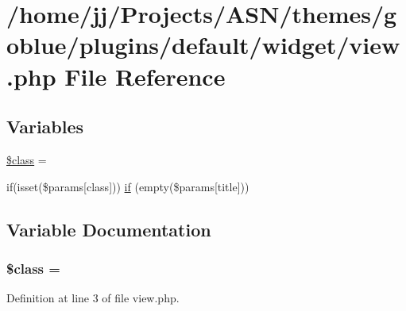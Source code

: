 \hypertarget{themes_2goblue_2plugins_2default_2widget_2view_8php}{}\section{/home/jj/\+Projects/\+A\+S\+N/themes/goblue/plugins/default/widget/view.php File Reference}
\label{themes_2goblue_2plugins_2default_2widget_2view_8php}
\subsection*{Variables}
\begin{DoxyCompactItemize}
\item 
\hyperlink{themes_2goblue_2plugins_2default_2widget_2view_8php_a252ba022809910ea710a068fc1bab657}{\$class} = \textquotesingle{}\textquotesingle{}
\item 
if(isset(\$params\mbox{[}\textquotesingle{}class\textquotesingle{}\mbox{]})) \hyperlink{themes_2goblue_2plugins_2default_2widget_2view_8php_a29158bf47ab232dfbfaf5bc7a931d4ae}{if} (empty(\$params\mbox{[}\textquotesingle{}title\textquotesingle{}\mbox{]}))
\end{DoxyCompactItemize}


\subsection{Variable Documentation}
\subsubsection[{\texorpdfstring{\$class}{$class}}]{\setlength{\rightskip}{0pt plus 5cm}\$class = \textquotesingle{}\textquotesingle{}}\hypertarget{themes_2goblue_2plugins_2default_2widget_2view_8php_a252ba022809910ea710a068fc1bab657}{}\label{themes_2goblue_2plugins_2default_2widget_2view_8php_a252ba022809910ea710a068fc1bab657}


Definition at line 3 of file view.\+php.

